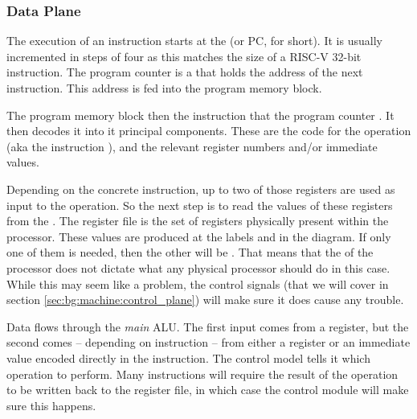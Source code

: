 \subsubsection{Data Plane}

The execution of an instruction starts at the  (or PC, for short). It is usually incremented in steps of four as this matches the size of a RISC-V 32-bit instruction. The program counter is a  that holds the address of the next instruction. This address is fed into the program memory block.

The program memory block then  the instruction that the program counter . It then decodes it into it principal components. These are the code for the operation (aka the instruction ), and the relevant register numbers and/or immediate values.

Depending on the concrete instruction, up to two of those registers are used as input to the operation. So the next step is to read the values of these registers from the . The register file is the set of registers physically present within the processor. These values are produced at the labels  and  in the diagram. If only one of them is needed, then the other will be . That means that the  of the processor does not dictate what any physical processor should do in this case. While this may seem like a problem, the control signals (that we will cover in section \ref{sec:bg:machine:control_plane}) will make sure it does cause any trouble.

Data flows through the \textsl{main} ALU. The first input comes from a register, but the second comes -- depending on instruction -- from either a register or an immediate value encoded directly in the instruction. The control model tells it which operation to perform. Many instructions will require the result of the operation to be written back to the register file, in which case the control module will make sure this happens.

